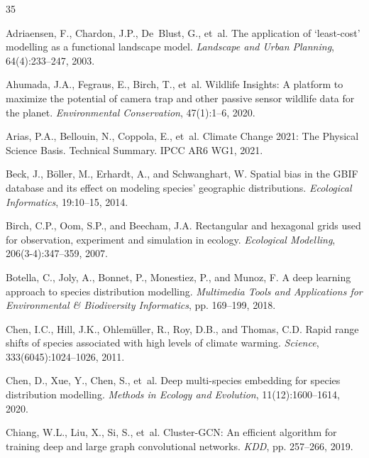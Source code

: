 \begin{thebibliography}{35}

Adriaensen, F., Chardon, J.P., De~Blust, G., et~al.
\newblock The application of `least-cost' modelling as a functional landscape
  model.
\newblock \emph{Landscape and Urban Planning}, 64(4):233--247, 2003.

Ahumada, J.A., Fegraus, E., Birch, T., et~al.
\newblock Wildlife Insights: A platform to maximize the potential of camera
  trap and other passive sensor wildlife data for the planet.
\newblock \emph{Environmental Conservation}, 47(1):1--6, 2020.

Arias, P.A., Bellouin, N., Coppola, E., et~al.
\newblock Climate Change 2021: The Physical Science Basis. Technical Summary.
\newblock IPCC AR6 WG1, 2021.

Beck, J., B{\"o}ller, M., Erhardt, A., and Schwanghart, W.
\newblock Spatial bias in the GBIF database and its effect on modeling species'
  geographic distributions.
\newblock \emph{Ecological Informatics}, 19:10--15, 2014.

Birch, C.P., Oom, S.P., and Beecham, J.A.
\newblock Rectangular and hexagonal grids used for observation, experiment and
  simulation in ecology.
\newblock \emph{Ecological Modelling}, 206(3-4):347--359, 2007.

Botella, C., Joly, A., Bonnet, P., Monestiez, P., and Munoz, F.
\newblock A deep learning approach to species distribution modelling.
\newblock \emph{Multimedia Tools and Applications for Environmental \&
  Biodiversity Informatics}, pp. 169--199, 2018.

Chen, I.C., Hill, J.K., Ohlem{\"u}ller, R., Roy, D.B., and Thomas, C.D.
\newblock Rapid range shifts of species associated with high levels of climate
  warming.
\newblock \emph{Science}, 333(6045):1024--1026, 2011.

Chen, D., Xue, Y., Chen, S., et~al.
\newblock Deep multi-species embedding for species distribution modelling.
\newblock \emph{Methods in Ecology and Evolution}, 11(12):1600--1614, 2020.

Chiang, W.L., Liu, X., Si, S., et~al.
\newblock Cluster-GCN: An efficient algorithm for training deep and large graph
  convolutional networks.
\newblock \emph{KDD}, pp. 257--266, 2019.


\end{thebibliography}
